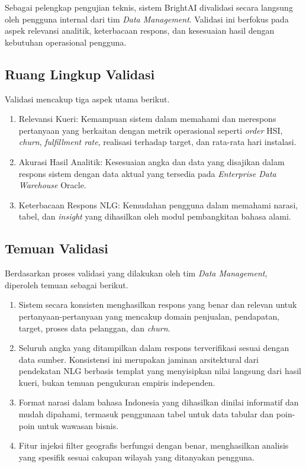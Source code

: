 Sebagai pelengkap pengujian teknis, sistem BrightAI divalidasi secara langsung oleh pengguna internal dari tim \textit{Data Management}. Validasi ini berfokus pada aspek relevansi analitik, keterbacaan respons, dan kesesuaian hasil dengan kebutuhan operasional pengguna.

\subsection{Ruang Lingkup Validasi}

Validasi mencakup tiga aspek utama berikut.

\begin{enumerate}
    \item Relevansi Kueri: Kemampuan sistem dalam memahami dan merespons pertanyaan yang berkaitan dengan metrik operasional seperti \textit{order} HSI, \textit{churn}, \textit{fulfillment rate}, realisasi terhadap target, dan rata-rata hari instalasi.
    \item Akurasi Hasil Analitik: Kesesuaian angka dan data yang disajikan dalam respons sistem dengan data aktual yang tersedia pada \textit{Enterprise Data Warehouse} Oracle.
    \item Keterbacaan Respons NLG: Kemudahan pengguna dalam memahami narasi, tabel, dan \textit{insight} yang dihasilkan oleh modul pembangkitan bahasa alami.
\end{enumerate}

\subsection{Temuan Validasi}

Berdasarkan proses validasi yang dilakukan oleh tim \textit{Data Management}, diperoleh temuan sebagai berikut.

\begin{enumerate}
    \item Sistem secara konsisten menghasilkan respons yang benar dan relevan untuk pertanyaan-pertanyaan yang mencakup domain penjualan, pendapatan, target, proses data pelanggan, dan \textit{churn}.
    \item Seluruh angka yang ditampilkan dalam respons terverifikasi sesuai dengan data sumber. Konsistensi ini merupakan jaminan arsitektural dari pendekatan NLG berbasis templat yang menyisipkan nilai langsung dari hasil kueri, bukan temuan pengukuran empiris independen.
    \item Format narasi dalam bahasa Indonesia yang dihasilkan dinilai informatif dan mudah dipahami, termasuk penggunaan tabel untuk data tabular dan poin-poin untuk wawasan bisnis.
    \item Fitur injeksi filter geografis berfungsi dengan benar, menghasilkan analisis yang spesifik sesuai cakupan wilayah yang ditanyakan pengguna.
\end{enumerate}

